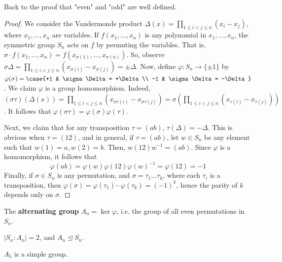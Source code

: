 Back to the proof that "even" and "odd" are well defined.

\begin{proof}
    We consider the Vandermonde product $\Delta (x) = \prod _{1 \leq i < j \leq n}(x_i-x_j)$, where $x_1,\dots,x_n$ are variables. If $f(x_1,\dots,x_n)$ is any polynomial in $x_1,\dots,x_n$, the symmetric group $S_n$ acts on $f$ by permuting the variables. That is, $\sigma \cdot f(x_1,\dots,x_n)=f(x_{\sigma(1)},\dots,x_{\sigma (n)})$. So, observe $\sigma \Delta = \prod_{1 \leq i < j \leq n}(x_{\sigma(i)}-x_{\sigma (j)})= \pm \Delta$. Now, define $\varphi : S_n \to \{ \pm 1\}$ by $\varphi(\sigma) = \case{+1 & \sigma \Delta = +\Delta \\ -1 & \sigma \Delta = -\Delta}$. We claim $\varphi$ is a group homomorphism. Indeed, $(\sigma \tau)(\Delta(x))=\prod_{ 1\leq i < j \leq n}(x_{\sigma \tau (i)}-x_{\sigma \tau (j)}) = \sigma \left ( \prod_{1 \leq i < j \leq n}(x_{\tau (i)} - x_{\tau (j)}) \right )$. It follows that $\varphi (\sigma \tau) = \varphi (\sigma) \varphi (\tau)$.

    Next, we claim that for any transposition $\tau =(ab)$, $\tau (\Delta)=-\Delta$. This is obvious when $\tau = (12)$, and in general, if $\tau = (ab)$, let $w \in S_n$ be any element such that $w(1)=a,w(2)=b$. Then, $w(12)w^{-1}=(ab)$. Since $\varphi$ is a homomorphism, it follows that
    $$\varphi (ab)=\varphi (w)\varphi (12) \varphi (w)^{-1}=\varphi (12)=-1$$
    Finally, if $\sigma \in S_n$ is any permutation, and $\sigma = \tau_1 \dots \tau _k$, where each $\tau _i$ is a transposition, then $\varphi (\sigma)=\varphi(\tau_1)\cdots \varphi(\tau _k)=(-1)^k$, hence the parity of $k$ depends only on $\sigma$.
\end{proof}

\begin{defn}
    The \textbf{alternating group} $A_n = \ker \varphi$, i.e. the group of all even permutations in $S_n$.
\end{defn}

\begin{prop}
    $|S_n : A_n|=2$, and $A_n \unlhd S_n$.
\end{prop}

\begin{thm}
    $A_5$ is a simple group.
\end{thm}

